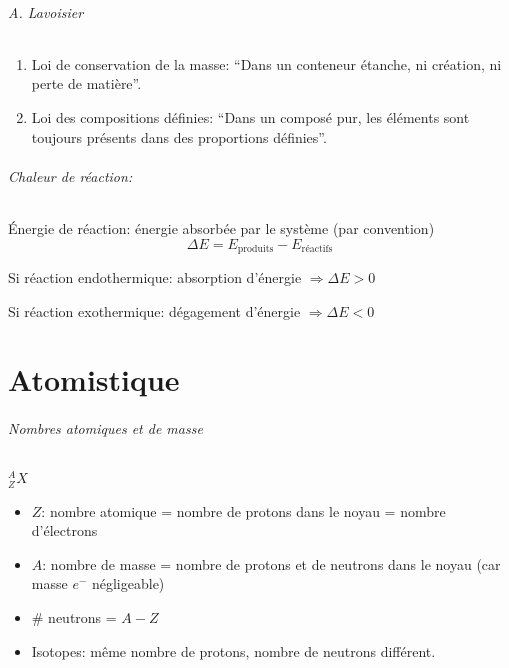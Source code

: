 \paragraph{A. Lavoisier}
\begin{enumerate}
  \item Loi de conservation de la masse: ``Dans un conteneur étanche, ni création, ni perte de matière''.
  \item Loi des compositions définies: ``Dans un composé pur, les éléments sont toujours présents dans des proportions définies''.
\end{enumerate}

\paragraph{Chaleur de réaction:}
\'Energie de réaction: énergie absorbée par le système (par convention)
$$\Delta E = E_{\textrm{produits}}-E_{\textrm{réactifs}}$$

Si réaction endothermique: absorption d'énergie $\Rightarrow \Delta E > 0$

Si réaction exothermique: dégagement d'énergie $\Rightarrow  \Delta E < 0$

\part{Atomistique}



\paragraph{Nombres atomiques et de masse}

\emph{$^{A}_{Z}X$}
\begin{itemize}
  \item $Z$: nombre atomique = nombre de protons dans le noyau = nombre d'électrons
  \item $A$: nombre de masse = nombre de protons et de neutrons dans le noyau (car masse $e^{-}$ négligeable)
  \item \# neutrons = $A-Z$
  \item Isotopes: même nombre de protons, nombre de neutrons différent.
\end{itemize}

